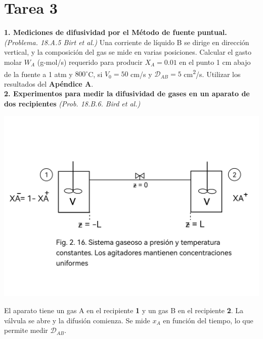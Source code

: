 \section*{Tarea 3}
\vspace{0.3cm} %
\flushleft
\textbf{1. Mediciones de difusividad por el Método de fuente puntual.}\textit{(Problema. 18.A.5 Birt et al.)}
\vspace{0.1cm} %
\flushleft
Una corriente de líquido B se dirige en dirección vertical, y la composición del gas se mide en varias posiciones. Calcular el gasto molar $W_A$ (g-mol/s) requerido para producir $X_A = 0.01$ en el punto 1 cm abajo de la fuente a 1 atm y $800^\circ$C, si $V_0 = 50$ cm/s y $\mathscr{D}_{AB} = 5$ cm\textsuperscript{2}/s. 
\vspace{0.1cm} %
\flushleft
Utilizar los resultados del \textbf{Apéndice A}.\\
\flushleft
\textbf{2. Experimentos para medir la difusividad de gases en un aparato de dos recipientes} \textit{(Prob. 18.B.6. Bird et al.)} 
\flushleft
\begin{minipage}{0.5\textwidth} %
    \includegraphics[width=\linewidth]{./Capitulo2/Imagenes/imagen-4.jpg} %
\end{minipage}
\hfill %
\begin{minipage}{0.45\textwidth} %
El aparato tiene un gas A en el recipiente \textbf{1} y un gas B en el recipiente \textbf{2}.  La válvula se abre y la difusión comienza.  Se mide $x_A$ en función del tiempo, lo que permite medir $\mathscr{D}_{AB}$.
\end{minipage}

